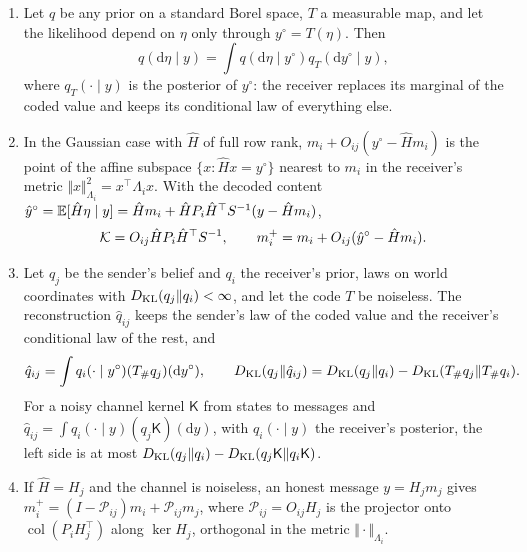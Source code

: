 \begin{proposition}\label{prop:fw-prior-completion}
\begin{enumerate}
\item[(a)] Let $q$ be any prior on a standard Borel space, $T$ a measurable map, and let the likelihood depend on $\eta$ only through $y^\circ=T(\eta)$. Then
\[
q(\mathrm d\eta\mid y)=\int q(\mathrm d\eta\mid y^\circ)q_T(\mathrm dy^\circ\mid y),
\]
where $q_T(\cdot\mid y)$ is the posterior of $y^\circ$: the receiver replaces its marginal of the coded value and keeps its conditional law of everything else.
\item[(b)] In the Gaussian case with $\hat H$ of full row rank, $m_i+O_{ij}(y^\circ-\hat Hm_i)$ is the point of the affine subspace $\{x:\hat Hx=y^\circ\}$ nearest to $m_i$ in the receiver's metric $\Vert x\Vert^2_{\Lambda_i}=x^\top\Lambda_ix$. With the decoded content $\hat y^\circ=\mathbb{E}[\hat H\eta\mid y]=\hat Hm_i+\hat HP_i\hat H^\top S^{-1}(y-\hat Hm_i)$,
\begin{equation}\label{eq:fw-decode-lift}
\mathcal{K}=O_{ij}\hat HP_i\hat H^\top S^{-1},\qquad m_i^+=m_i+O_{ij}(\hat y^\circ-\hat Hm_i).
\end{equation}
\item[(c)] Let $q_j$ be the sender's belief and $q_i$ the receiver's prior, laws on world coordinates with $D_{\mathrm{KL}}(q_j\Vert q_i)<\infty$, and let the code $T$ be noiseless. The reconstruction $\hat q_{ij}$ keeps the sender's law of the coded value and the receiver's conditional law of the rest, and
\begin{equation}\label{eq:fw-meaning-lost}
\hat q_{ij}=\int q_i(\cdot\mid y^\circ)(T_\#q_j)(\mathrm dy^\circ),\qquad D_{\mathrm{KL}}(q_j\Vert\hat q_{ij})=D_{\mathrm{KL}}(q_j\Vert q_i)-D_{\mathrm{KL}}(T_\#q_j\Vert T_\#q_i).
\end{equation}
For a noisy channel kernel $\mathsf K$ from states to messages and $\hat q_{ij}=\int q_i(\cdot\mid y)(q_j\mathsf K)(\mathrm dy)$, with $q_i(\cdot\mid y)$ the receiver's posterior, the left side is at most $D_{\mathrm{KL}}(q_j\Vert q_i)-D_{\mathrm{KL}}(q_j\mathsf K\Vert q_i\mathsf K)$.
\item[(d)] If $\hat H=H_j$ and the channel is noiseless, an honest message $y=H_jm_j$ gives $m_i^+=(I-\mathcal P_{ij})m_i+\mathcal P_{ij}m_j$, where $\mathcal P_{ij}=O_{ij}H_j$ is the projector onto $\operatorname{col}(P_iH_j^\top)$ along $\ker H_j$, orthogonal in the metric $\Vert\cdot\Vert_{\Lambda_i}$.
\end{enumerate}
\end{proposition}

